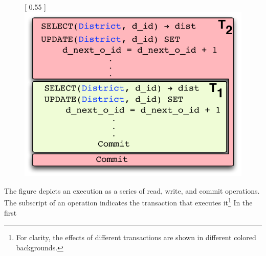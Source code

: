 \begin{figure}[!h]
\centering
{} [
  0.55\columnwidth
] {
  \includegraphics[scale=0.5]{Figures/motiv-eg-1-a}
}
\end{figure}
The figure depicts an execution as a series of read, write, and commit
operations.  The subscript of an operation indicates the transaction
that executes it\footnote{For clarity, the effects of different
transactions are shown in different colored backgrounds.} In the first
